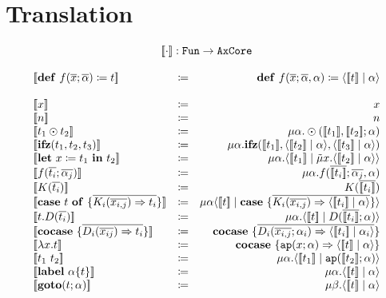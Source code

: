 \documentclass[nonacm]{acmart}
\newcommand{\translate}[1]{\ensuremath{[\![#1]\!]}}
\newcommand{\cut}[2]{\ensuremath{\langle #1 \mid #2 \rangle}}
\newcommand{\letin}[3]{\ensuremath{\mathbf{let}\ #1 \coloneq #2\ \mathbf{in}\ #3}}
\newcommand{\caseof}[2]{\ensuremath{\mathbf{case}\ #1\ \mathbf{of}\ \{ #2 \}}}
\begin{document}
\section{Translation}
\[
  \begin{array}{l c r}
    \multicolumn{3}{c}{\translate{\cdot} : \mathtt{Fun} \rightarrow \mathtt{AxCore}}\\
    \\
    \translate{\mathbf{def}\ f(\overline{x};\overline{\alpha}) \coloneq t} & \coloneq & \mathbf{def}\ f(\overline{x};\overline{\alpha},\alpha) \coloneq \cut{\translate{t}}{\alpha}\\
  \quad \\
    \translate{x} & \coloneq & x\\
    \translate{n} & \coloneq & n\\
    \translate{t_1 \odot t_2} & \coloneq & \mu \alpha.\odot(\translate{t_1},\translate{t_2};\alpha)\\
    \translate{\mathbf{ifz}(t_1,t_2,t_3)} & \coloneq & \mu \alpha.\mathbf{ifz}(\translate{t_1},\cut{\translate{t_2}}{\alpha},\cut{\translate{t_3}}{\alpha}) \\
    \translate{\letin{x}{t_1}{t_2}} & \coloneq & \mu \alpha.\cut{\translate{t_1}}{\tilde{\mu}x.\cut{\translate{t_2}}{\alpha}}\\
    \translate{f(\overline{t_i};\overline{\alpha_j})} & \coloneq & \mu \alpha.f(\overline{\translate{t_i}};\overline{\alpha_j},\alpha)\\
    \translate{K(\overline{t_i})} & \coloneq & K(\overline{\translate{t_i}})\\
    \translate{\caseof{t}{\overline{K_i(\overline{x_{i,j}}) \Rightarrow t_i}}} & \coloneq & \mu \alpha \cut{\translate{t}}{\mathbf{case}\ \{ \overline{K_i(\overline{x_{i,j}}) \Rightarrow \cut{\translate{t_i}}{\alpha}}\}}\\
    \translate{t.D(\overline{t_i})} & \coloneq & \mu\alpha.\cut{\translate{t}}{D(\overline{\translate{t_i}};\alpha)}\\
    \translate{\mathbf{cocase}\ \{\overline{D_i(\overline{x_{ij}})\Rightarrow t_i}\}} & \coloneq & \mathbf{cocase}\ \{ \overline{D_i(\overline{x_{i,j}};\alpha_i)\Rightarrow \cut{\translate{t_i}}{\alpha_i}} \} \\
    \translate{\lambda x.t} & \coloneq & \mathbf{cocase}\ \{ \mathtt{ap}(x;\alpha) \Rightarrow \cut{\translate{t}}{\alpha}\}\\
    \translate{t_1\ t_2} & \coloneq & \mu \alpha. \cut{\translate{t_1}}{\mathtt{ap}(\translate{t_2};\alpha)}\\
    \translate{\mathbf{label}\ \alpha \{t\}} & \coloneq & \mu\alpha. \cut{\translate{t}}{\alpha}\\
    \translate{\mathbf{goto}(t;\alpha)} & \coloneq & \mu\beta.\cut{\translate{t}}{\alpha}
  \end{array}
\]
\end{document}
